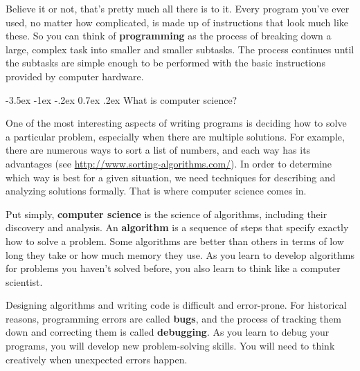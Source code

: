 \documentclass[12pt]{book}
\makeatletter
\theoremstyle{exercise}
\renewcommand{\section}{\@startsection {section}{1}{\z@}%
    {-3.5ex \@plus -1ex \@minus -.2ex}%
    {0.7ex \@plus.2ex}%
    {\normalfont\Large\bfseries}}
\makeatother
\begin{document}

Believe it or not, that's pretty much all there is to it.
Every program you've ever used, no matter how complicated, is made up of instructions that look much like these.
So you can think of {\bf programming} as the process of breaking down a large, complex task into smaller and smaller subtasks.
The process continues until the subtasks are simple enough to be performed with the basic instructions provided by computer hardware.


\section{What is computer science?}

One of the most interesting aspects of writing programs is deciding how to solve a particular problem, especially when there are multiple solutions.
For example, there are numerous ways to sort a list of numbers, and each way has its advantages (see \url{http://www.sorting-algorithms.com/}).
In order to determine which way is best for a given situation, we need techniques for describing and analyzing solutions formally.
That is where computer science comes in.


Put simply, {\bf computer science} is the science of algorithms, including their discovery and analysis.
An {\bf algorithm} is a sequence of steps that specify exactly how to solve a problem.
Some algorithms are better than others in terms of low long they take or how much memory they use.
As you learn to develop algorithms for problems you haven't solved before, you also learn to think like a computer scientist.


Designing algorithms and writing code is difficult and error-prone.
For historical reasons, programming errors are called {\bf bugs}, and the process of tracking them down and correcting them is called {\bf debugging}.
As you learn to debug your programs, you will develop new problem-solving skills.
You will need to think creatively when unexpected errors happen.

\end{document}
